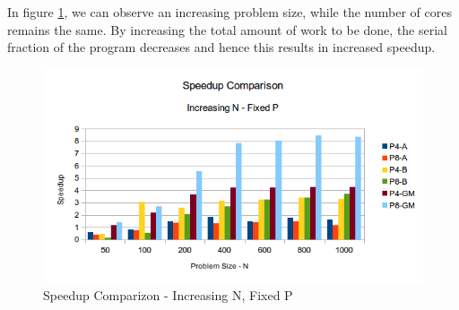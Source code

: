 \documentclass[conference]{IEEEtran}
\begin{document}
In figure \ref{pic:omp_speedup_comp2}, we can observe an increasing problem size, while the number of cores remains the same. By increasing the total amount of work to be done, the serial fraction of the program decreases and hence this results in increased speedup.

\begin{figure}[h]
  \centering
  \includegraphics[scale=0.55]{pic/omp_speedup2_comp.png} 
  \caption{Speedup Comparizon - Increasing N, Fixed P}
  \label{pic:omp_speedup_comp2}
\end{figure}



%
%

\end{document}

